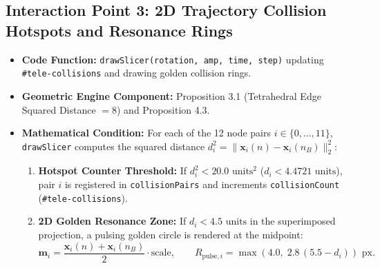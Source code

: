 \documentclass[11pt, a4paper]{article}
\begin{document}
\subsection{Interaction Point 3: 2D Trajectory Collision Hotspots and Resonance Rings}
\begin{itemize}
    \item \textbf{Code Function:} \texttt{drawSlicer(rotation, amp, time, step)} updating \texttt{\#tele-collisions} and drawing golden collision rings.
    \item \textbf{Geometric Engine Component:} Proposition 3.1 (Tetrahedral Edge Squared Distance $= 8$) and Proposition 4.3.
    \item \textbf{Mathematical Condition:}
    For each of the 12 node pairs $i \in \{0, \dots, 11\}$, \texttt{drawSlicer} computes the squared distance $d_i^2 = \|\mathbf{x}_i(n) - \mathbf{x}_i(n_B)\|_2^2$:
    \begin{enumerate}
        \item \textbf{Hotspot Counter Threshold:} If $d_i^2 < 20.0\text{ units}^2$ ($d_i < 4.4721\text{ units}$), pair $i$ is registered in \texttt{collisionPairs} and increments \texttt{collisionCount} (\texttt{\#tele-collisions}).
        \item \textbf{2D Golden Resonance Zone:} If $d_i < 4.5\text{ units}$ in the superimposed projection, a pulsing golden circle is rendered at the midpoint:
        \begin{equation}
        \mathbf{m}_i = \frac{\mathbf{x}_i(n) + \mathbf{x}_i(n_B)}{2}\cdot \text{scale}, \qquad R_{\text{pulse},i} = \max\!\left(4.0,\; 2.8\,(5.5 - d_i)\right)\text{ px}.
        \end{equation}
    \end{enumerate}
\end{itemize}
\end{document}
